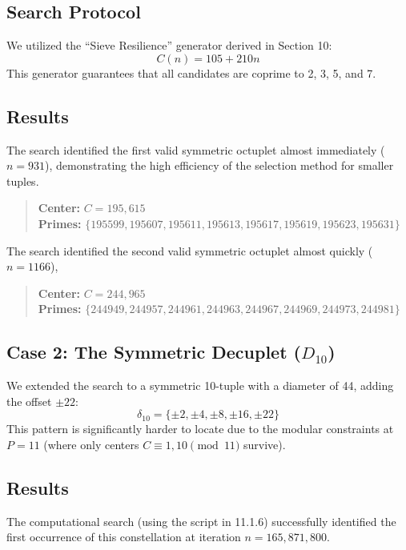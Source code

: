 \documentclass[sn-mathphys-num, pdflatex]{sn-jnl}
\begin{document}
\subsection{Search Protocol}
We utilized the ``Sieve Resilience'' generator derived in Section 10:
\begin{equation}
    C(n) = 105 + 210n
\end{equation}
This generator guarantees that all candidates are coprime to 2, 3, 5, and 7.

\subsection{Results}
The search identified the first valid symmetric octuplet almost immediately ($n=931$), demonstrating the high efficiency of the selection method for smaller tuples.

\begin{quote}
\textbf{Center:} $C = 195,615$ \\
\textbf{Primes:} $\{ 195599, 195607, 195611, 195613, 195617, 195619, 195623, 195631 \}$
\end{quote}
The search identified the second valid symmetric octuplet almost quickly ($n=1166$), 

\begin{quote}
\textbf{Center:} $C=244,965$ \\
\textbf{Primes:} $\{ 244949, 244957, 244961, 244963, 244967, 244969, 244973, 244981 \}$ 
\end{quote}
\subsection{Case 2: The Symmetric Decuplet \texorpdfstring{($D_{10}$)}{(D10)}}
We extended the search to a symmetric 10-tuple with a diameter of 44, adding the offset $\pm 22$:
\begin{equation}
    \delta_{10} = \{\pm 2, \pm 4, \pm 8, \pm 16, \pm 22\}
\end{equation}
This pattern is significantly harder to locate due to the modular constraints at $P=11$ (where only centers $C \equiv 1, 10 \pmod{11}$ survive).

\subsection{Results}
The computational search (using the script in 11.1.6) successfully identified the first occurrence of this constellation at iteration $n = 165,871,800$.
\end{document}
